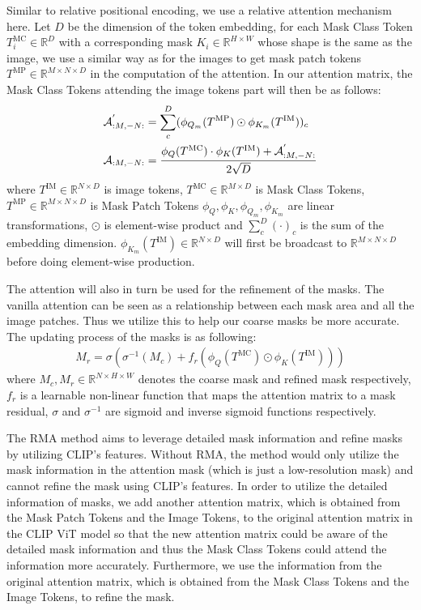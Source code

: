 \documentclass{article}
\theoremstyle{plain}
\theoremstyle{definition}
\theoremstyle{remark}
\newcommand{\sigmoid}{\sigma}
\begin{document}
Similar to relative positional encoding, we use a relative attention mechanism here. Let $D$ be the dimension of the token embedding, 
for each Mask Class Token $T^{\text{MC}}_i\in \mathbb{R}^{D}$ with a corresponding mask $K_i\in \mathbb{R}^{H\times W}$ whose shape is the same as the image, we use a similar way as for the images to get mask patch tokens $T^{\text{MP}}\in \mathbb{R}^{M\times N\times D}$ in the computation of the attention. In our attention matrix, the Mask Class Tokens attending the image tokens part will then be as follows:
\begin{align}
    \label{eq:a1}
    \mathcal{A}^{'}_{:M, -N:} &= \sum_{c}^{D}(\phi_{Q_m}(T^{\text{MP}})\odot \phi_{K_m}(T^{\text{IM}}))_{c} \\
    \mathcal{A}_{:M, -N:} & = \frac{\phi_Q(T^{\text{MC}})\cdot \phi_K(T^{\text{IM}}) + \mathcal{A}^{'}_{:M, -N:}}{2\sqrt{D}}
\end{align}
where $T^{\text{IM}}\in \mathbb{R}^{N\times D}$ is image tokens, $T^{\text{MC}}\in \mathbb{R}^{M\times D}$ is Mask Class Tokens, $T^{\text{MP}}\in \mathbb{R}^{M\times N\times D}$ is Mask Patch Tokens $\phi_Q, \phi_K, \phi_{Q_m}, \phi_{K_m}$ are linear transformations, $\odot$ is element-wise product and $\sum_c^{D}(\cdot)_c$ is the sum of the embedding dimension. $\phi_{K_m}(T^{\text{IM}}) \in \mathbb{R}^{N\times D}$ will first be broadcast to $\mathbb{R}^{M\times N\times D}$ before doing element-wise production.

The attention will also in turn be used for the refinement of the masks. The vanilla attention can be seen as a relationship between each mask area and all the image patches. Thus we utilize this to help our coarse masks be more accurate. The updating process of the masks is as following:
\begin{align}
\label{eq:refine}
    M_r = \sigmoid(\sigmoid^{-1}(M_c) + f_r(\phi_Q(T^{\text{MC}})\odot \phi_K(T^{\text{IM}})))
\end{align}
where $M_c, M_r\in \mathbb{R}^{N\times H\times W}$ denotes the coarse mask and refined mask respectively, $f_r$ is a learnable non-linear function that maps the attention matrix to a mask residual, $\sigmoid$ and $\sigmoid^{-1}$ are sigmoid and inverse sigmoid functions respectively.

The RMA method aims to leverage detailed mask information and refine masks by utilizing CLIP's features. Without RMA, the method would only utilize the mask information in the attention mask (which is just a low-resolution mask) and cannot refine the mask using CLIP's features. In order to utilize the detailed information of masks, we add another attention matrix, which is obtained from the Mask Patch Tokens and the Image Tokens, to the original attention matrix in the CLIP ViT model so that the new attention matrix could be aware of the detailed mask information and thus the Mask Class Tokens could attend the information more accurately. Furthermore, we use the information from the original attention matrix, which is obtained from the Mask Class Tokens and the Image Tokens, to refine the mask.
\end{document}

